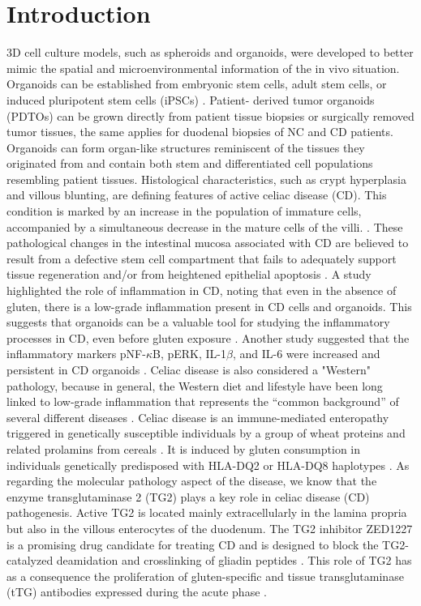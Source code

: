 \documentclass[12pt]{article}
\begin{document}
\section{Introduction}
\noindent 3D cell culture models, such as spheroids and organoids,
were developed to better mimic the spatial and microenvironmental information of the in vivo situation. Organoids can be established from embryonic stem cells, adult stem cells, or induced pluripotent stem cells (iPSCs) \supercite{kim2020comparison}. Patient-
derived tumor organoids (PDTOs) can be grown directly from patient tissue biopsies or surgically removed tumor tissues, the same applies for duodenal biopsies of NC and CD patients. Organoids can form organ-like structures reminiscent of the tissues they originated from and contain both stem and differentiated cell populations resembling patient tissues. Histological characteristics, such as crypt hyperplasia and villous blunting, are defining features of active celiac disease (CD). This condition is marked by an increase in the population of immature cells, accompanied by a simultaneous decrease in the mature cells of the villi. \supercite{piscaglia2015circulating}. These pathological changes in the intestinal mucosa associated with CD are believed to result from a defective stem cell compartment that fails to adequately support tissue regeneration and/or from heightened epithelial apoptosis \supercite{shalimar2013mechanism}. A study highlighted the role of inflammation in CD, noting that even in the absence of gluten, there is a low-grade inflammation present in CD cells and organoids. This suggests that organoids can be a valuable tool for studying the inflammatory processes in CD, even before gluten exposure \supercite{barone2022pivotal}. Another study suggested that the inflammatory markers pNF-$\kappa$B, pERK,
IL-1$\beta$, and IL-6 were increased and persistent in CD organoids \supercite{porpora2022inflammation}.
Celiac disease is also considered a "Western" pathology, because in general, the Western diet and lifestyle have been long linked to low-grade inflammation that represents the “common background” of
several different diseases \supercite{minihane2015low}. Celiac disease is an immune-mediated enteropathy triggered in genetically susceptible individuals
by a group of wheat proteins and related prolamins from cereals \supercite{sollid2013triggers}. It is induced by gluten consumption in individuals genetically predisposed with HLA-DQ2 or HLA-DQ8 haplotypes \supercite{leonard2017celiac}.
As regarding the molecular pathology aspect of the disease, we know that the enzyme transglutaminase 2 (TG2) plays a key role in celiac disease (CD) pathogenesis. Active TG2 is located mainly extracellularly in the lamina propria but also in the villous enterocytes of the duodenum. The TG2 inhibitor ZED1227 is a promising drug candidate for treating CD and is designed to block the TG2-catalyzed deamidation and crosslinking of gliadin peptides \supercite{isola2023oral}. This role of TG2 has as a consequence the proliferation of gluten-specific and tissue transglutaminase (tTG) antibodies expressed during the acute phase \supercite{husby2012european}.
\end{document}
